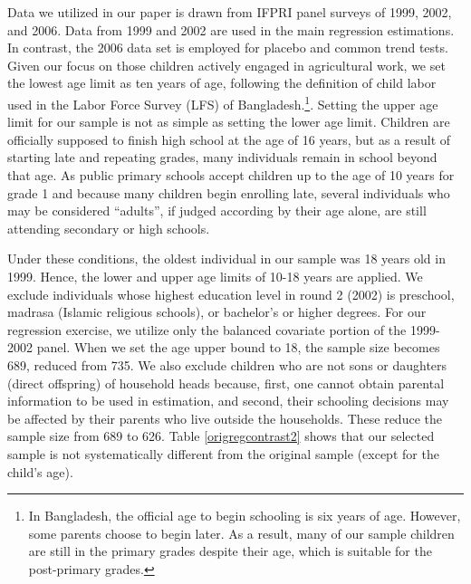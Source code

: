 \documentclass[12pt,letterpaper]{article}\usepackage[margin=1in]{geometry}
\newcommand{\0}{\ensuremath{\mbox{\boldmath $0$}}}
\begin{document}
Data we utilized in our paper is drawn from IFPRI panel surveys of 1999, 2002, and 2006. Data from 1999 and 2002 are used in the main regression estimations. In contrast, the 2006 data set is employed for placebo and common trend tests. Given our focus on those children actively engaged in agricultural work, we set the lowest age limit as ten years of age, following the definition of child labor used in the Labor Force Survey (LFS) of Bangladesh.\footnote{In Bangladesh, the official age to begin schooling is six years of age. However, some parents choose to begin later. As a result, many of our sample children are still in the primary grades despite their age, which is suitable for the post-primary grades.}. Setting the upper age limit for our sample is not as simple as setting the lower age limit. Children are officially supposed to finish high school at the age of 16 years, but as a result of starting late and repeating grades, many individuals remain in school beyond that age. As public primary schools accept children up to the age of 10 years for grade 1 and because many children begin enrolling late, several individuals who may be considered  ``adults'',  if judged according by their age alone, are still attending secondary or high schools.

Under these conditions, the oldest individual in our sample was 18 years old in 1999. Hence, the lower and upper age limits of 10-18 years are applied. We exclude individuals whose highest education level in round 2 (2002) is preschool, madrasa (Islamic religious schools), or bachelor's or higher degrees. For our regression exercise, we utilize only the balanced covariate portion of the 1999-2002 panel. When we set the age upper bound to 18, the sample size becomes 689, reduced from 735. We also exclude children who are not sons or daughters (direct offspring) of household heads because, first, one cannot obtain parental information to be used in estimation, and second, their schooling decisions may be affected by their parents who live outside the households. These reduce the sample size from 689 to 626. Table \ref{origregcontrast2} shows that our selected sample is not systematically different from the original sample (except for the child's age). 
\end{document}
